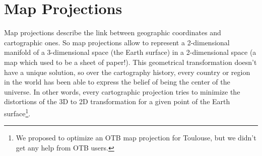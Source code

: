 




\section{Map Projections}
\ifitkFullVersion
\label{sec:MapProjections}
\fi

Map projections describe the link between geographic coordinates and
cartographic ones. So map projections allow to represent a 2-dimensional manifold of a
3-dimensional space (the Earth surface) in a 2-dimensional space (a
map which used to be a sheet of paper!). This geometrical
transformation doesn't have a unique solution, so over the cartography
history, every country or region in the world has been able to express
the belief of being the center of the universe. In other words, every
cartographic projection tries to minimize the distortions of the 3D to
2D transformation for a given point of the Earth surface\footnote{We
  proposed to optimize an OTB map projection for Toulouse, but we
  didn't get any help from OTB users.}.

